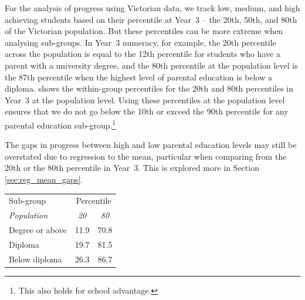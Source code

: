 For the analysis of progress using Victorian data, we track low, medium, and high achieving students based on their percentile at \mbox{Year 3} -- the 20th, 50th, and 80th of the Victorian population. But these percentiles can be more extreme when analysing sub-groups. In \mbox{Year 3} numeracy, for example, the 20th percentile across the population is equal to the 12th percentile for students who have a parent with a university degree, and the 80th percentile at the population level is the 87th percentile when the highest level of parental education is below a diploma.  shows the within-group percentiles for the 20th and 80th percentiles in \mbox{Year 3} at the population level. Using these percentiles at the population level ensures that we do not go below the 10th or exceed the 90th percentile for any parental education sub-group.\footnote{This also holds for school advantage.}

The gaps in progress between high and low parental education levels may still be overstated due to regression to the mean, particular when comparing from the 20th or the 80th percentile in \mbox{Year 3}. This is explored more in Section \ref{sec:reg_mean_gaps}.

\newpage
\begin{table}[htbp]
  \centering
    \begin{tabular}{lcc}

 Sub-group & \multicolumn{2}{c}{Percentile} \\ \cmidrule(lr){1-1}
\cmidrule(lr){2-3}
    \textit{Population} & \textit{20}   & \textit{80} \\
    Degree or above & 11.9  & 70.8 \\
    Diploma & 19.7    & 81.5 \\
    Below diploma & 26.3    & 86.7 \\
    \bottomrule
    \end{tabular}%
  \label{tab:percentiles}%
\begin{flushleft}

\end{flushleft}
\end{table}%
\vspace{-18pt}

